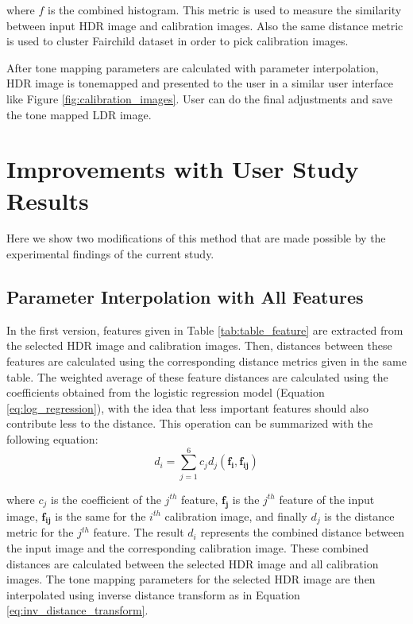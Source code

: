 where \textbf{$f$} is the combined histogram. This metric is used to measure the similarity between input HDR image and calibration images. Also the same distance metric is used to cluster Fairchild dataset in order to pick calibration images.

After tone mapping parameters are calculated with parameter interpolation, HDR image is tonemapped and presented to the user in a similar user interface like Figure \ref{fig:calibration_images}. User can do the final adjustments and save the tone mapped LDR image. %

\section{Improvements with User Study Results}
Here we show two modifications of this method that are made possible by the experimental findings of the current study.

\subsection{Parameter Interpolation with All Features}
In the first version, features given in Table \ref{tab:table_feature} are extracted from the selected HDR image and calibration images. Then, distances between these features are calculated using the corresponding distance metrics given in the same table. The weighted average of these feature distances are calculated using the coefficients obtained from the logistic regression model (Equation \ref{eq:log_regression}), with the idea that less important features should also contribute less to the distance. This operation can be summarized with the following equation:
\begin{equation}
    d_i = \sum_{j=1}^{6}c_j d_j(\mathbf{f_i}, \mathbf{f_{ij}})
\end{equation}


where $c_j$ is the coefficient of the $j^{th}$ feature, $\mathbf{f_j}$ is the $j^{th}$ feature of the input image, $\mathbf{f_{ij}}$ is the same for the $i^{th}$ calibration image, and finally $d_j$ is the distance metric for the $j^{th}$ feature. The result $d_i$ represents the combined distance between the input image and the corresponding calibration image. These combined distances are calculated between the selected HDR image and all calibration images. The tone mapping parameters for the selected HDR image are then interpolated using inverse distance transform as in Equation \ref{eq:inv_distance_transform}.

